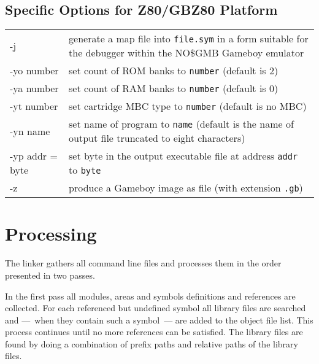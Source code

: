 \documentclass[10pt]{article}
\newcommand{\code}[1]{{\lstset{basicstyle=\normalsize\ttfamily}\lstinline!#1!}}
\newenvironment{optionList}{\begin{center}\begin{tabular}{p{4cm}p{8cm}}}%
                           {\end{tabular}\end{center}}
\begin{document}
\subsection{Specific Options for Z80/GBZ80 Platform}
  \begin{optionList}
    -j              & generate a map file into \code{file.sym} in a form
                      suitable for the debugger within the NO\$GMB Gameboy
                      emulator\\

    -yo number      & set count of ROM banks to \code{number} (default is 2)\\

    -ya number      & set count of RAM banks to \code{number} (default is 0)\\

    -yt number      & set cartridge MBC type to \code{number} (default is
                      no MBC)\\

    -yn name        & set name of program to \code{name} (default is the
                      name of output file truncated to eight characters)\\

    -yp addr = byte & set byte in the output executable file at
                      address \code{addr} to \code{byte}\\

    -z              & produce a Gameboy image as file (with extension
                      \code{.gb})
  \end{optionList}



\section{Processing}

The linker gathers all command line files and processes them in the
order presented in two passes.

In the first pass all modules, areas and symbols definitions and
references are collected.  For each referenced but undefined symbol
all library files are searched and ---~when they contain such a
symbol~--- are added to the object file list.  This process continues
until no more references can be satisfied.  The library files are
found by doing a combination of prefix paths and relative paths of the
library files.
\end{document}
